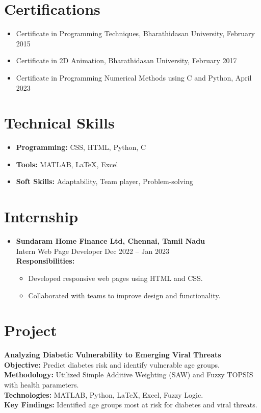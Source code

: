 \documentclass[a4paper,10pt]{article}
\begin{document}
\section*{Certifications}
\begin{itemize}[leftmargin=1.5cm]
    \item Certificate in Programming Techniques, Bharathidasan University, February 2015
    \item Certificate in 2D Animation, Bharathidasan University, February 2017
    \item Certificate in Programming Numerical Methods using C and Python, April 2023
\end{itemize}

\section*{Technical Skills}
\begin{itemize}[leftmargin=1.5cm]
    \item \textbf{Programming:} CSS, HTML, Python, C
    \item \textbf{Tools:} MATLAB, LaTeX, Excel
    \item \textbf{Soft Skills:} Adaptability, Team player, Problem-solving
\end{itemize}

\section*{Internship}
\begin{itemize}[leftmargin=1.5cm]
    \item \textbf{Sundaram Home Finance Ltd, Chennai, Tamil Nadu} \\
    Intern Web Page Developer \hfill Dec 2022 -- Jan 2023 \\
    \textbf{Responsibilities:}
    \begin{itemize}[leftmargin=1cm]
        \item Developed responsive web pages using HTML and CSS.
        \item Collaborated with teams to improve design and functionality.
    \end{itemize}
\end{itemize}

\section*{Project}
\textbf{Analyzing Diabetic Vulnerability to Emerging Viral Threats} \\
\textbf{Objective:} Predict diabetes risk and identify vulnerable age groups. \\
\textbf{Methodology:} Utilized Simple Additive Weighting (SAW) and Fuzzy TOPSIS with health parameters. \\
\textbf{Technologies:} MATLAB, Python, LaTeX, Excel, Fuzzy Logic. \\
\textbf{Key Findings:} Identified age groups most at risk for diabetes and viral threats.
\end{document}
